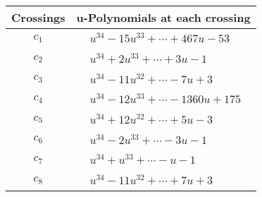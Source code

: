 \documentclass[1p]{elsarticle_modified}
\theoremstyle{definition}
\begin{document}
\begin{tabular}{m{50pt}|m{274pt}}
Crossings & \hspace{64pt}u-Polynomials at each crossing \\
\hline $$\begin{aligned}c_{1}\end{aligned}$$&$\begin{aligned}
&u^{34}-15 u^{33}+\cdots+467 u-53
\end{aligned}$\\
\hline $$\begin{aligned}c_{2}\end{aligned}$$&$\begin{aligned}
&u^{34}+2 u^{33}+\cdots+3 u-1
\end{aligned}$\\
\hline $$\begin{aligned}c_{3}\end{aligned}$$&$\begin{aligned}
&u^{34}-11 u^{32}+\cdots-7 u+3
\end{aligned}$\\
\hline $$\begin{aligned}c_{4}\end{aligned}$$&$\begin{aligned}
&u^{34}-12 u^{33}+\cdots-1360 u+175
\end{aligned}$\\
\hline $$\begin{aligned}c_{5}\end{aligned}$$&$\begin{aligned}
&u^{34}+12 u^{32}+\cdots+5 u-3
\end{aligned}$\\
\hline $$\begin{aligned}c_{6}\end{aligned}$$&$\begin{aligned}
&u^{34}-2 u^{33}+\cdots-3 u-1
\end{aligned}$\\
\hline $$\begin{aligned}c_{7}\end{aligned}$$&$\begin{aligned}
&u^{34}+u^{33}+\cdots- u-1
\end{aligned}$\\
\hline $$\begin{aligned}c_{8}\end{aligned}$$&$\begin{aligned}
&u^{34}-11 u^{32}+\cdots+7 u+3
\end{aligned}$\\

\end{tabular}
\end{document}

